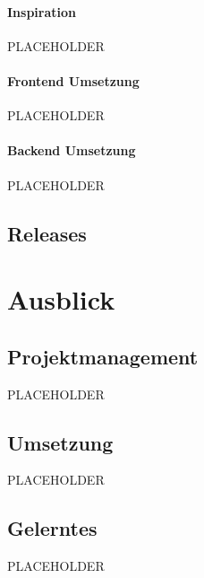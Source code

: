\paragraph{Inspiration}
\label{sec:orgac8bf86}

PLACEHOLDER

\paragraph{Frontend Umsetzung}
\label{sec:orge01dc90}

PLACEHOLDER

\paragraph{Backend Umsetzung}
\label{sec:org41e1f3f}

PLACEHOLDER

\subsection{Releases}
\label{sec:orgc187131}

\section{Ausblick}
\label{sec:orgd795a85}
\subsection{Projektmanagement}
\label{sec:org17dacac}

PLACEHOLDER

\subsection{Umsetzung}
\label{sec:orgb506a80}

PLACEHOLDER

\subsection{Gelerntes}
\label{sec:org666d5d3}

PLACEHOLDER

